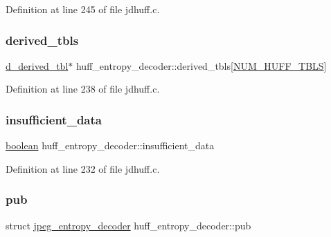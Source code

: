 Definition at line 245 of file jdhuff.\+c.

\mbox{\label{structhuff__entropy__decoder_a615d2735aebeee55b9820f09700677be}} 
\subsubsection{\texorpdfstring{derived\_tbls}{derived\_tbls}}
{\footnotesize\ttfamily \mbox{\hyperlink{structd__derived__tbl}{d\+\_\+derived\+\_\+tbl}}$\ast$ huff\+\_\+entropy\+\_\+decoder\+::derived\+\_\+tbls\mbox{[}\mbox{\hyperlink{jpeglib_8h_a6b12985705944e0623b671f29dc5722e}{N\+U\+M\+\_\+\+H\+U\+F\+F\+\_\+\+T\+B\+LS}}\mbox{]}}



Definition at line 238 of file jdhuff.\+c.

\mbox{\label{structhuff__entropy__decoder_a412a9c88d74ed51774d25757b602b7ae}} 
\subsubsection{\texorpdfstring{insufficient\_data}{insufficient\_data}}
{\footnotesize\ttfamily \mbox{\hyperlink{jmorecfg_8h_a7c6368b321bd9acd0149b030bb8275ed}{boolean}} huff\+\_\+entropy\+\_\+decoder\+::insufficient\+\_\+data}



Definition at line 232 of file jdhuff.\+c.

\mbox{\label{structhuff__entropy__decoder_a85f304c89441e96be66e49685cf24c3d}} 
\subsubsection{\texorpdfstring{pub}{pub}}
{\footnotesize\ttfamily struct \mbox{\hyperlink{structjpeg__entropy__decoder}{jpeg\+\_\+entropy\+\_\+decoder}} huff\+\_\+entropy\+\_\+decoder\+::pub}




